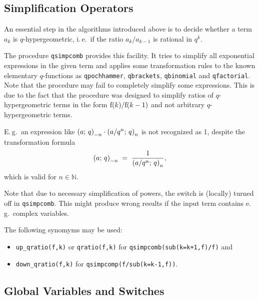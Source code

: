 \subsection{Simplification Operators}
\label{qsum:simplification}

An essential step in the algorithms introduced above is to decide
whether a term $a_k$ is $q$-hypergeometric, i.\,e.\ if the
ratio $a_{k}/a_{k-1}$ is rational in $q^k$.

The procedure \texttt{qsimpcomb} provides this facility. It tries to
simplify all exponential expressions in the given term and applies
some transformation rules to the known elementary $q$-functions
as \texttt{qpochhammer}, \texttt{qbrackets}, \texttt{qbinomial}
and \texttt{qfactorial}. Note that the procedure may fail to
completely simplify some expressions. This is due to the fact that the
procedure was designed to simplify ratios of $q$-hypergeometric
terms in the form ${\mathrm f}(k)/{\mathrm f}(k-1)$ and not arbitrary 
$q$-hypergeometric terms. 

E.\,g.\ an expression like 
$\left(a;\,q\right)_{-n}\cdot\left(a/q^n;\,q\right)_{n}$
is not recognized as 1, despite the transformation formula
\[ \left(a;\,q\right)_{-n} \;=\; \frac{1}{\left(a/q^n;\,q\right)_{n}},\]
which is valid for $n\in\mathbb{N}$.

Note that due to necessary simplification of powers, the switch
 is (locally) turned off in \texttt{qsimpcomb}. This
might produce wrong results if the input term contains 
e.\,g.\ complex variables.

The following synomyms may be used:
\begin{itemize}
	\item \texttt{up\_qratio(f,k)} or \texttt{qratio(f,k)} for
		\texttt{qsimpcomb(sub(k=k+1,f)/f)} and
	\item \texttt{down\_qratio(f,k)} for \texttt{qsimpcomp(f/sub(k=k-1,f))}.
\end{itemize}


\subsection{Global Variables and Switches}
\label{switches}

